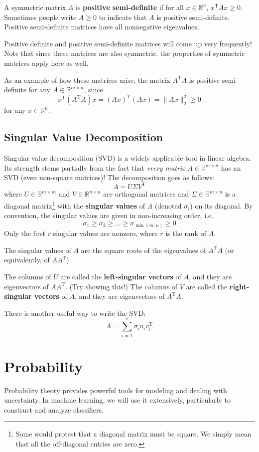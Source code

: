 \documentclass{article}
\newcommand{\R}{\mathbb{R}}
\newcommand{\tran}{^\text{T}}
\newcommand{\term}[1]{\textbf{#1}}
\begin{document}
A symmetric matrix $A$ is \term{positive semi-definite} if for all $x \in \R^n$, $x\tran Ax \geq 0$. Sometimes people write $A \geq 0$ to indicate that $A$ is positive semi-definite. Positive semi-definite matrices have all nonnegative eigenvalues.

Positive definite and positive semi-definite matrices will come up very frequently! Note that since these matrices are also symmetric, the properties of symmetric matrices apply here as well.

As an example of how these matrices arise, the matrix $A\tran A$ is positive semi-definite for any $A \in \R^{m \times n}$, since
\[x\tran (A\tran A)x = (Ax)\tran(Ax) = \|Ax\|_2^2 \geq 0\]
for any $x \in \R^n$.

\subsection{Singular Value Decomposition}
Singular value decomposition (SVD) is a widely applicable tool in linear algebra. Its strength stems partially from the fact that \textit{every matrix} $A \in \R^{m \times n}$ has an SVD (even non-square matrices)! The decomposition goes as follows:
\[A = U\Sigma V\tran\]
where $U \in \R^{m \times m}$ and $V \in \R^{n \times n}$ are orthogonal matrices and $\Sigma \in \R^{m \times n}$ is a diagonal matrix\footnote{Some would protest that a diagonal matrix must be square. We simply mean that all the off-diagonal entries are zero.} with the \term{singular values} of $A$ (denoted $\sigma_i$) on its diagonal. By convention, the singular values are given in non-increasing order, i.e.
\[\sigma_1 \geq \sigma_2 \geq \dots \geq \sigma_{\min(m,n)} \geq 0\]
Only the first $r$ singular values are nonzero, where $r$ is the rank of $A$.

The singular values of $A$ are the square roots of the eigenvalues of $A\tran A$ (or equivalently, of $AA\tran$).

The columns of $U$ are called the \term{left-singular vectors} of $A$, and they are eigenvectors of $AA\tran$. (Try showing this!) The columns of $V$ are called the \term{right-singular vectors} of $A$, and they are eigenvectors of $A\tran A$.

There is another useful way to write the SVD:
\[A = \sum_{i=1}^r \sigma_i u_i v_i\tran\]

\newpage
\section{Probability}
Probability theory provides powerful tools for modeling and dealing with uncertainty. In machine learning, we will use it extensively, particularly to construct and analyze classifiers.
\end{document}
